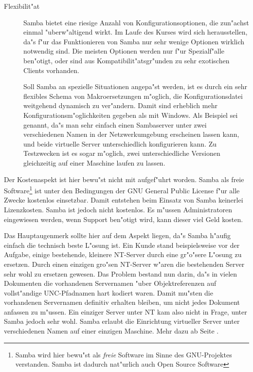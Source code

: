 \documentclass{scrartcl}\usepackage{pslatex}\typearea{12}
\begin{document}
\begin{description}
\item[Flexibilit"at] Samba bietet eine riesige Anzahl von
  Konfigurationsoptionen, die zun"achst einmal "uberw"altigend wirkt.
  Im Laufe des Kurses wird sich herausstellen, da"s f"ur das
  Funktionieren von Samba nur sehr wenige Optionen wirklich notwendig
  sind. Die meisten Optionen werden nur f"ur Spezialf"alle ben"otigt,
  oder sind aus Kompatibilit"atsgr"unden zu sehr exotischen Clients
  vorhanden.
  
  Soll Samba an spezielle Situationen angepa"st werden, ist es durch
  ein sehr flexibles Schema von Makroersetzungen m"oglich, die
  Konfigurationsdatei weitgehend dynamisch zu ver"andern. Damit sind
  erheblich mehr Konfigurationsm"oglichkeiten gegeben als mit Windows.
  Als Beispiel sei genannt, da"s man sehr einfach einen Sambaserver
  unter zwei verschiedenen Namen in der Netzwerkumgebung erscheinen
  lassen kann, und beide virtuelle Server unterschiedlich
  konfigurieren kann. Zu Testzwecken ist es sogar m"oglich, zwei
  unterschiedliche Versionen gleichzeitig auf einer Maschine laufen zu
  lassen.

\end{description}

Der Kostenaspekt ist hier bewu"st nicht mit aufgef"uhrt worden. Samba
als freie Software\footnote{Samba wird hier bewu"st als \emph{freie}
  Software im Sinne des GNU-Projektes verstanden. Samba ist dadurch
  nat"urlich auch Open Source Software} ist unter den Bedingungen der
GNU General Public License f"ur alle Zwecke kostenlos einsetzbar.
Damit entstehen beim Einsatz von Samba keinerlei Lizenzkosten. Samba
ist jedoch nicht kostenlos. Es m"ussen Administratoren eingewiesen
werden, wenn Support ben"otigt wird, kann dieser viel Geld kosten.

Das Hauptaugenmerk sollte hier auf dem Aspekt liegen, da"s Samba
h"aufig einfach die technisch beste L"osung ist. Ein Kunde stand
beispielsweise vor der Aufgabe, einige bestehende, kleinere NT-Server
durch eine gr"o"sere L"osung zu ersetzen. Durch einen einzigen gro"sen
NT-Server w"aren die bestehenden Server sehr wohl zu ersetzen gewesen.
Das Problem bestand nun darin, da"s in vielen Dokumenten die
vorhandenen Servernamen "uber Objektreferenzen auf vollst"andige
UNC-Pfadnamen hart kodiert waren. Damit mu"sten die vorhandenen
Servernamen definitiv erhalten bleiben, um nicht jedes Dokument
anfassen zu m"ussen. Ein einziger Server unter NT kam also nicht in
Frage, unter Samba jedoch sehr wohl. Samba erlaubt die Einrichtung
virtueller Server unter verschiedenen Namen auf einer einzigen
Maschine. Mehr dazu ab Seite \pageref{virtuelle-server}.
\end{document}
